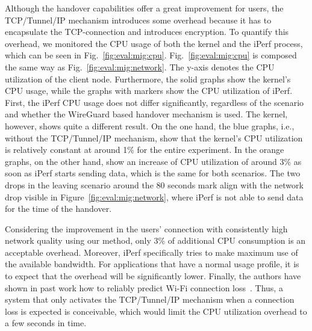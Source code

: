 Although the handover capabilities offer a great improvement for users, the TCP/Tunnel/IP mechanism introduces some overhead because it has to encapsulate the TCP-connection and introduces encryption.
To quantify this overhead, we monitored the CPU usage of both the kernel and the iPerf process, which can be seen in Fig.~\ref{fig:eval:mig:cpu}.
Fig.~\ref{fig:eval:mig:cpu} is composed the same way as Fig.~\ref{fig:eval:mig:network}.
The y-axis denotes the CPU utilization of the client node.
Furthermore, the solid graphs show the kernel's CPU usage, while the graphs with markers show the CPU utilization of iPerf.
First, the iPerf CPU usage does not differ significantly, regardless of the scenario and whether the WireGuard based handover mechanism is used.
The kernel, however, shows quite a different result.
On the one hand, the blue graphs, i.e., without the TCP/Tunnel/IP mechanism, show that the kernel's CPU utilization is relatively constant at around 1\% for the entire experiment.
In the orange graphs, on the other hand, show an increase of CPU utilization of around 3\% as soon as iPerf starts sending data, which is the same for both scenarios.
The two drops in the leaving scenario around the 80 seconds mark align with the network drop visible in Figure~\ref{fig:eval:mig:network}, where iPerf is not able to send data for the time of the handover.

Considering the improvement in the users' connection with consistently high network quality using our method, only 3\% of additional CPU consumption is an acceptable overhead.
Moreover, iPerf specifically tries to make maximum use of the available bandwidth.
For applications that have a normal usage profile, it is to expect that the overhead will be significantly lower.
Finally, the authors have shown in past work how to reliably predict Wi-Fi connection loss~\cite{hochst2019learning}.
Thus, a system that only activates the TCP/Tunnel/IP mechanism when a connection loss is expected is conceivable, which would limit the CPU utilization overhead to a few seconds in time.
